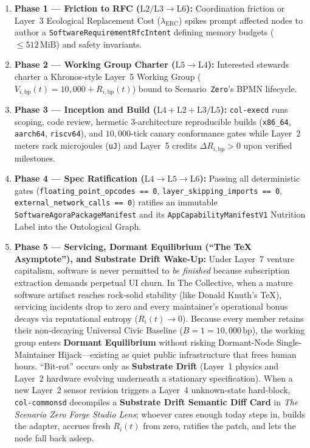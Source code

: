 \begin{enumerate}
    \item \textbf{Phase 1 --- Friction to RFC ($\mathrm{L2/L3} \to \mathrm{L6}$):} Coordination friction or Layer~3 Ecological Replacement Cost ($\lambda_{\mathrm{ERC}}$) spikes prompt affected nodes to author a \texttt{SoftwareRequirementRfcIntent} defining memory budgets ($\le 512\,\mathrm{MiB}$) and safety invariants.
    \item \textbf{Phase 2 --- Working Group Charter ($\mathrm{L5} \to \mathrm{L4}$):} Interested stewards charter a Khronos-style Layer~5 Working Group ($V_{i,\mathrm{bp}}(t) = 10{,}000 + R_{i,\mathrm{bp}}(t)$) bound to Scenario~\texttt{Zero}'s BPMN lifecycle.
    \item \textbf{Phase 3 --- Inception and Build ($\mathrm{L4} + \mathrm{L2} + \mathrm{L3/L5}$):} \texttt{col-execd} runs scoping, code review, hermetic 3-architecture reproducible builds (\texttt{x86\_64}, \texttt{aarch64}, \texttt{riscv64}), and $10{,}000$-tick canary conformance gates while Layer~2 meters rack microjoules (\texttt{uJ}) and Layer~5 credits $\Delta R_{i,\mathrm{bp}} > 0$ upon verified milestones.
    \item \textbf{Phase 4 --- Spec Ratification ($\mathrm{L4} \to \mathrm{L5} \to \mathrm{L6}$):} Passing all deterministic gates (\texttt{floating\_point\_opcodes == 0}, \texttt{layer\_skipping\_imports == 0}, \texttt{external\_network\_calls == 0}) ratifies an immutable \texttt{SoftwareAgoraPackageManifest} and its \texttt{AppCapabilityManifestV1} Nutrition Label into the Ontological Graph.
    \item \textbf{Phase 5 --- Servicing, Dormant Equilibrium (``The \TeX{} Asymptote''), and Substrate Drift Wake-Up:} Under Layer~7 venture capitalism, software is never permitted to \emph{be finished} because subscription extraction demands perpetual UI churn. In The Collective, when a mature software artifact reaches rock-solid stability (like Donald Knuth's \TeX{}), servicing incidents drop to zero and every maintainer's operational bonus decays via reputational entropy ($R_i(t) \to 0$). Because every member retains their non-decaying Universal Civic Baseline ($B = 1 = 10{,}000\,\mathrm{bp}$), the working group enters \textbf{Dormant Equilibrium} without risking Dormant-Node Single-Maintainer Hijack---existing as quiet public infrastructure that frees human hours. ``Bit-rot'' occurs only as \textbf{Substrate Drift} (Layer~1 physics and Layer~2 hardware evolving underneath a stationary specification). When a new Layer~2 sensor revision triggers a Layer~4 unknown-state hard-block, \texttt{col-commonsd} decompiles a \textbf{Substrate Drift Semantic Diff Card} in \textit{The Scenario Zero Forge Studio Lens}; whoever cares enough today steps in, builds the adapter, accrues fresh $R_i(t)$ from zero, ratifies the patch, and lets the node fall back asleep.
\end{enumerate}

